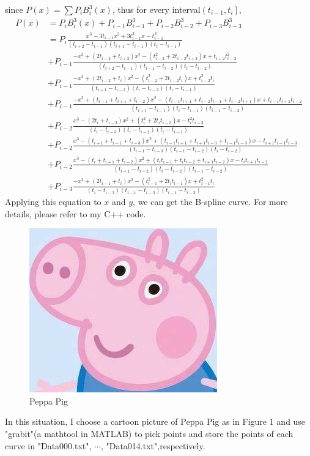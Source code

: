 \documentclass[]{article}
\begin{document}
since $\displaystyle P(x) = \sum P_iB_i^3(x) $, thus for every interval$\displaystyle\left(t_{i-1},t_i\right]$,
\begin{align*}
	P(x) &= P_iB_i^3(x) + P_{i-1}B_{i-1}^3 + P_{i-2}B_{i-2}^3 + P_{i-3}B_{i-3}^3 \\
	&= P_i\frac{x^3 - 3t_{i-1}x^2 + 3t_{i-1}^2x - t_{i-1}^3}  {(t_{i+2} - t_{i-1})(t_{i+1} - t_{i-1})(t_i - t_{i-1})} \\
	&+ P_{i-1}\frac{-x^3 + (2t_{i-2}+t_{i+2})x^2 - (t_{i-2}^2+2t_{i-2}t_{i+2})x + t_{i+2}t_{i-2}^2}  {(t_{i+2} - t_{i-1})(t_{i-1} - t_{i-2})(t_i - t_{i-2})} \\
	&+ P_{i-1}\frac{-x^3 + (2t_{i-2}+t_i)x^2 - (t_{i-2}^2+2t_{i-2}t_i)x + t_{i-2}^2t_i}  {(t_{i+1} - t_{i-2})(t_i - t_{i-2})(t_i-t_{i-1})} \\
	&+ P_{i-1}\frac{-x^3 + (t_{i-1}+t_{i+1}+t_{i-2})x^2 - (t_{i-1}t_{i+1}+t_{i-2}t_{i-1}+t_{i-2}t_{i+1})x+t_{i-1}t_{i+1}t_{i-2}}  {(t_{i+1}-t_{i-1})(t_i-t_{i-1})(t_{i-1}-t_{i-2})} \\
	&+ P_{i-2}\frac{x^3 - (2t_i+t_{i-3})x^2 + (t_i^2+2t_it_{i-3})x - t_i^2t_{i-3}}  {(t_i-t_{i-3})(t_i-t_{i-2})(t_i-t_{i-1})} \\
	&+ P_{i-2}\frac{x^3 - (t_{i+1}+t_{i-1}+t_{i-3})x^2 + (t_{i-1}t_{i+1}+t_{i+1}t_{i-3}+t_{i-1}t_{i-3})x - t_{i+1}t_{i-1}t_{i-3}}  {(t_{i-1}-t_{i-3})(t_{i-1}-t_{i-2})(t_i-t_{i-2})} \\
	&+ P_{i-2}\frac{x^3 - (t_i+t_{i+1}+t_{i-2})x^2 + (t_it_{i-1}+t_it_{i-2}+t_{i+1}t_{i-2})x - t_it_{i+1}t_{i-2}}  {(t_{i+1}-t_{i-2})(t_i-t_{i-2})(t_{i-1}-t_{i-2})} \\
	&+ P_{i-3}\frac{-x^3 + (2t_{i-1}+t_i)x^2 - (t_{i-1}^2+2t_it_{i-1})x + t_{i-1}^2t_i}  {(t_i-t_{i-3})(t_{i-1}-t_{i-3})(t_{i-1}-t_{i-2})}
\end{align*}
Applying this equation to $x$ and $y$, we can get the B-spline curve. For more details, please refer to my C++ code.
\par
\begin{figure}[ht]
	\centering
	\includegraphics[scale = 0.8]{fig.jpg}
	\caption{Peppa Pig}
	\label{fig:fig}
\end{figure}
In this situation, I choose a cartoon picture of Peppa Pig as in Figure 1
and use "grabit"(a mathtool in MATLAB) to pick points and store the points of each curve in "Data000.txt", $\cdots$, "Data014.txt",respectively.
\end{document}
